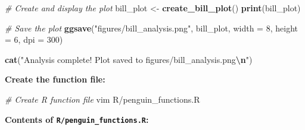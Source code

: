 \documentclass[
]{article}
\newenvironment{Shaded}{\begin{snugshade}}{\end{snugshade}}
\newcommand{\AttributeTok}[1]{\textcolor[rgb]{0.13,0.29,0.53}{#1}}
\newcommand{\CommentTok}[1]{\textcolor[rgb]{0.56,0.35,0.01}{\textit{#1}}}
\newcommand{\DecValTok}[1]{\textcolor[rgb]{0.00,0.00,0.81}{#1}}
\newcommand{\ExtensionTok}[1]{#1}
\newcommand{\FunctionTok}[1]{\textcolor[rgb]{0.13,0.29,0.53}{\textbf{#1}}}
\newcommand{\NormalTok}[1]{#1}
\newcommand{\OtherTok}[1]{\textcolor[rgb]{0.56,0.35,0.01}{#1}}
\newcommand{\SpecialCharTok}[1]{\textcolor[rgb]{0.81,0.36,0.00}{\textbf{#1}}}
\newcommand{\StringTok}[1]{\textcolor[rgb]{0.31,0.60,0.02}{#1}}
\begin{document}
\begin{Shaded}
\begin{Highlighting}[]
\CommentTok{\# Create and display the plot}
\NormalTok{bill\_plot }\OtherTok{\textless{}{-}} \FunctionTok{create\_bill\_plot}\NormalTok{()}
\FunctionTok{print}\NormalTok{(bill\_plot)}

\CommentTok{\# Save the plot}
\FunctionTok{ggsave}\NormalTok{(}\StringTok{"figures/bill\_analysis.png"}\NormalTok{, bill\_plot, }\AttributeTok{width =} \DecValTok{8}\NormalTok{, }\AttributeTok{height =} \DecValTok{6}\NormalTok{, }\AttributeTok{dpi =} \DecValTok{300}\NormalTok{)}

\FunctionTok{cat}\NormalTok{(}\StringTok{"Analysis complete! Plot saved to figures/bill\_analysis.png}\SpecialCharTok{\textbackslash{}n}\StringTok{"}\NormalTok{)}
\end{Highlighting}
\end{Shaded}

\textbf{Create the function file:}

\begin{Shaded}
\begin{Highlighting}[]
\CommentTok{\# Create R function file}
\ExtensionTok{vim}\NormalTok{ R/penguin\_functions.R}
\end{Highlighting}
\end{Shaded}

\textbf{Contents of \texttt{R/penguin\_functions.R}:}
\end{document}
